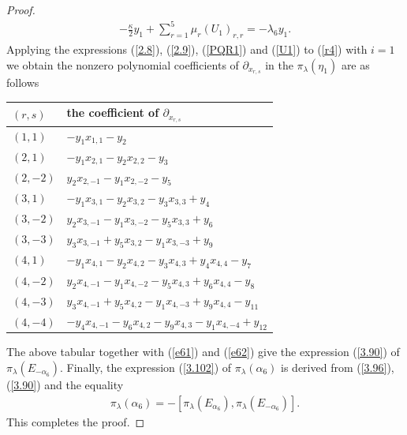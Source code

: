 \documentclass[12pt]{article}
\numberwithin{equation}{section}
\theoremstyle{definition}
\theoremstyle{remark}
\begin{document}
\begin{proof}
\begin{eqnarray}
			-\frac{\kappa}{2}y_1+\sum_{r=1}^{5}\mu_r(U_1)_{r,r}=-\lambda_6y_1. \label{e62}
		\end{eqnarray} 
		Applying the expressions (\ref{2.8}), (\ref{2.9}), (\ref{PQR1}) and (\ref{U1}) to (\ref{r4}) with $i=1$ we obtain the nonzero polynomial coefficients of $\partial_{x_{r,s}}$ in the $\pi_{\lambda}(\eta_1)$ are as follows
		\begin{center}
			\renewcommand{\arraystretch}{1.15}
			\begin{tabular}{@{}ll@{}}
				\toprule
				$(r,s)$ & the coefficient of $\partial_{x_{r,s}}$\\
				\midrule
				$(1,1)$ & $-y_1x_{1,1}-y_2$\\
				$(2,1)$ & $-y_1x_{2,1}-y_2x_{2,2}-y_3$\\
				$(2,-2)$ & $y_2x_{2,-1}-y_1x_{2,-2}-y_5$ \\
				$(3,1)$ & $-y_1x_{3,1}-y_2x_{3,2}-y_3x_{3,3}+y_4$\\
				$(3,-2)$ & $y_2x_{3,-1}-y_1x_{3,-2}-y_5x_{3,3}+y_6$\\
				$(3,-3)$ & $y_3x_{3,-1}+y_5x_{3,2}-y_1x_{3,-3}+y_9$\\
				$(4,1)$ &  $-y_1x_{4,1}-y_2x_{4,2}-y_3x_{4,3}+y_4x_{4,4}-y_7$\\
				$(4,-2)$ & $y_2x_{4,-1}-y_1x_{4,-2}-y_5x_{4,3}+y_6x_{4,4}-y_8$\\
				$(4,-3)$ & $y_3x_{4,-1}+y_5x_{4,2}-y_1x_{4,-3}+y_9x_{4,4}-y_{11}$\\
				$(4,-4)$ & $-y_4x_{4,-1}-y_6x_{4,2}-y_9x_{4,3}-y_1x_{4,-4}+y_{12}$\\
				\bottomrule
			\end{tabular}
		\end{center}
		\vspace{3mm}
		
		The above tabular together with (\ref{e61}) and (\ref{e62}) give the expression (\ref{3.90}) of $\pi_{\lambda}(E_{-\alpha_6})$. Finally, the expression (\ref{3.102}) of $\pi_{\lambda}(\alpha_6)$ is derived from (\ref{3.96}), (\ref{3.90}) and the equality
		\begin{eqnarray}
			\pi_{\lambda}(\alpha_6)=-[\pi_{\lambda}(E_{\alpha_6}),\pi_{\lambda}(E_{-\alpha_6})].
		\end{eqnarray}
		This completes the proof.
	\end{proof}
\end{document}

